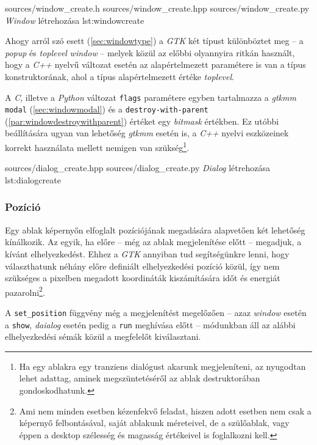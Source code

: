 \lsttriplesourcev
{sources/window_create.h}
{sources/window_create.hpp}
{sources/window_create.py}
{\textit{Window} létrehozása}
{lst:windowcreate}

Ahogy arról szó esett (\ref{sec:windowtype}) a \textit{GTK} két típust különböztet meg -- a \textit{popup} és \textit{toplevel} \textit{window} -- melyek közül az előbbi olyannyira ritkán használt, hogy a \textit{C++} nyelvű változat esetén az alapértelmezett paramétere is van a típus konstruktorának, ahol a típus alapértelmezett értéke \textit{toplevel}.

A \textit{C}, illetve a \textit{Python} változat \texttt{flags} paramétere egyben tartalmazza a \textit{gtkmm} \texttt{modal} (\ref{sec:windowmodal}) és a \texttt{destroy-with-parent} (\ref{par:windowdestroywithparent}) értéket egy \textit{bitmask} értékben. Ez utóbbi beállítására ugyan van lehetőség \textit{gtkmm} esetén is, a \textit{C++} nyelvi eszközeinek korrekt használata mellett nemigen van szükség\footnote{Ha egy ablakra egy tranziens dialógust akarunk megjeleníteni, az nyugodtan lehet adattag, aminek megszüntetéséről az ablak destruktorában gondoskodhatunk.}.

{sources/dialog_create.hpp}
{sources/dialog_create.py}
{\textit{Dialog} létrehozása}
{lst:dialogcreate}

\subsubsection{Pozíció}
\label{sec:windowpos}

Egy ablak képernyőn elfoglalt pozíciójának megadására alapvetően két lehetőség kínálkozik. Az egyik, ha előre -- még az ablak megjelenítése előtt -- megadjuk, a kívánt elhelyezkedést. Ehhez a \textit{GTK} annyiban tud segítségünkre lenni, hogy választhatunk néhány előre definiált elhelyezkedési pozíció közül, így nem szükséges a pixelben megadott koordináták kiszámítására időt és energiát pazarolni\footnote{Ami nem minden esetben kézenfekvő feladat, hiszen adott esetben nem csak a képernyő felbontásával, saját ablakunk méreteivel, de a szülőablak, vagy éppen a desktop szélesség és magasság értékeivel is foglalkozni kell.}.

A \texttt{set\_position} függvény még a megjelenítést megelőzően -- azaz \textit{window} esetén a \texttt{show}, \textit{daialog} esetén pedig a \texttt{run} meghívása előtt -- módunkban áll az alábbi elhelyezkedési sémák közül a megfelelőt kiválasztani.

